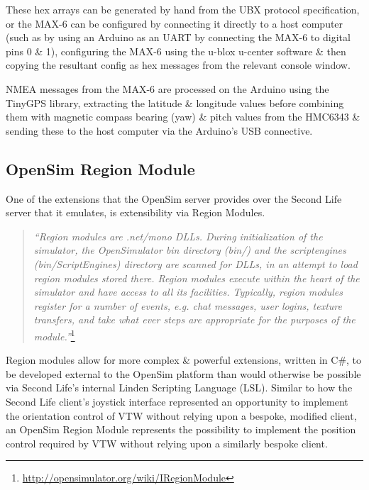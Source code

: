 These hex arrays can be generated by hand from the UBX protocol specification\maxProtocolFootnote{}, or the MAX-6 can be configured by connecting it directly to a host computer (such as by using an Arduino as an UART by connecting the MAX-6 to digital pins 0 \& 1), configuring the MAX-6 using the u-blox u-center software \& then copying the resultant config as hex messages from the relevant console window.

NMEA messages from the MAX-6 are processed on the Arduino using the TinyGPS library\tinygpsFootnote{}, extracting the latitude \& longitude values before combining them with magnetic compass bearing (yaw) \& pitch values from the HMC6343 \& sending these to the host computer via the Arduino's USB connective.


\subsection{OpenSim Region Module}

\label{regionModule}

\newcommand{\RegionModuleFootnote}{\footnote{\url{http://opensimulator.org/wiki/IRegionModule}}}

\newcommand{\RegionModuleCodeFootnote}{\footnote{\url{https://bitbucket.org/cj_davies/sharedregionmodulegpsavatar}}}


One of the extensions that the OpenSim server provides over the Second Life server that it emulates, is extensibility via Region Modules.

\begin{quotation}
	\textit{``Region modules are .net/mono DLLs. During initialization of the simulator, the OpenSimulator bin directory (bin/) and the scriptengines (bin/ScriptEngines) directory are scanned for DLLs, in an attempt to load region modules stored there. Region modules execute within the heart of the simulator and have access to all its facilities. Typically, region modules register for a number of events, e.g. chat messages, user logins, texture transfers, and take what ever steps are appropriate for the purposes of the module.''}\RegionModuleFootnote{}
\end{quotation}

Region modules allow for more complex \& powerful extensions, written in C\#, to be developed external to the OpenSim platform than would otherwise be possible via Second Life's internal Linden Scripting Language (LSL). Similar to how the Second Life client's joystick interface represented an opportunity to implement the orientation control of VTW without relying upon a bespoke, modified client, an OpenSim Region Module represents the possibility to implement the position control required by VTW without relying upon a similarly bespoke client.

